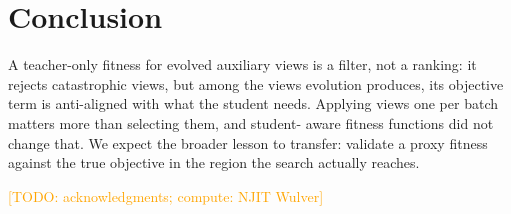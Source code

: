 \documentclass[sigconf,review,anonymous]{acmart}
\newcommand{\todo}[1]{\textcolor{orange}{[TODO: #1]}}
\begin{document}
\section{Conclusion}

A teacher-only fitness for evolved auxiliary views is a filter, not a
ranking: it rejects catastrophic views, but among the views evolution
produces, its objective term is anti-aligned with what the student needs.
Applying views one per batch matters more than selecting them, and student-
aware fitness functions did not change that. We expect the broader lesson
to transfer: validate a proxy fitness against the true objective in the
region the search actually reaches.

\begin{acks}
\todo{acknowledgments; compute: NJIT Wulver}
\end{acks}



\end{document}
